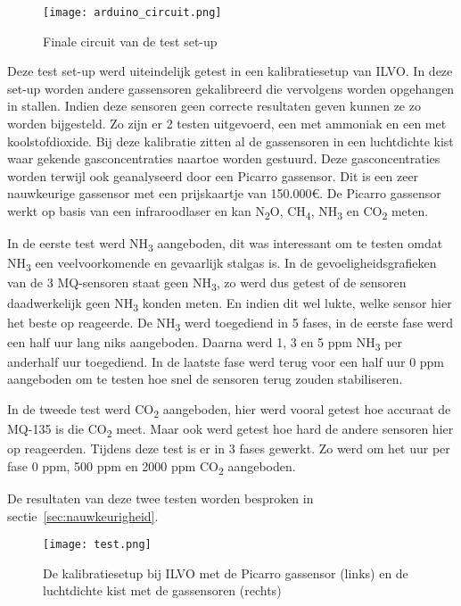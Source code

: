 \begin{figure}[h]
    \texttt{[image: arduino\_circuit.png]}
    \caption[Circuit test set-up]{Finale circuit van de test set-up}
    \label{fig:arduino_circuit}
\end{figure}

\pagebreak

Deze test set-up werd uiteindelijk getest in een kalibratiesetup van ILVO. In deze set-up worden andere gassensoren gekalibreerd die vervolgens worden opgehangen in stallen. Indien deze sensoren geen correcte resultaten geven kunnen ze zo worden bijgesteld. Zo zijn er 2 testen uitgevoerd, een met ammoniak en een met koolstofdioxide. Bij deze kalibratie zitten al de gassensoren in een luchtdichte kist waar gekende gasconcentraties naartoe worden gestuurd. Deze gasconcentraties worden terwijl ook geanalyseerd door een Picarro gassensor. Dit is een zeer nauwkeurige gassensor met een prijskaartje van 150.000€. De Picarro gassensor werkt op basis van een infraroodlaser en kan N\textsubscript{2}O, CH\textsubscript{4}, NH\textsubscript{3} en CO\textsubscript{2} meten.

In de eerste test werd NH\textsubscript{3} aangeboden, dit was interessant om te testen omdat NH\textsubscript{3} een veelvoorkomende en gevaarlijk stalgas is. In de gevoeligheidsgrafieken van de 3 MQ-sensoren staat geen NH\textsubscript{3}, zo werd dus getest of de sensoren daadwerkelijk geen NH\textsubscript{3} konden meten. En indien dit wel lukte, welke sensor hier het beste op reageerde. De NH\textsubscript{3} werd toegediend in 5 fases, in de eerste fase werd een half uur lang niks aangeboden. Daarna werd 1, 3 en 5 ppm NH\textsubscript{3} per anderhalf uur toegediend. In de laatste fase werd terug voor een half uur 0 ppm aangeboden om te testen hoe snel de sensoren terug zouden stabiliseren.

In de tweede test werd CO\textsubscript{2} aangeboden, hier werd vooral getest hoe accuraat de MQ-135 is die CO\textsubscript{2} meet. Maar ook werd getest hoe hard de andere sensoren hier op reageerden. Tijdens deze test is er in 3 fases gewerkt. Zo werd om het uur per fase 0 ppm, 500 ppm en 2000 ppm CO\textsubscript{2} aangeboden.

De resultaten van deze twee testen worden besproken in sectie~\ref{sec:nauwkeurigheid}.

\begin{figure}[h]
    \texttt{[image: test.png]}
    \caption[Kalibratiesetup]{De kalibratiesetup bij ILVO met de Picarro gassensor (links) en de luchtdichte kist met de gassensoren (rechts)}
    \label{fig:test}
\end{figure}








